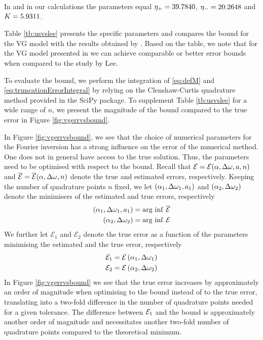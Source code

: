 \documentclass[11pt]{amsart}
\begin{document}
In \cite{lee2004option} and in our calculations the parameters equal
$\eta_+ = 39.7840$, $\eta_- = 20.2648$ and $K=5.9311$.



Table \ref{tb:usvslee} presents the specific parameters and compares
the bound for the VG model with the results obtained by \cite{lee2004option}.
Based on the table, we note that for the VG model
presented in \cite{madan1998variance} we can achieve comparable or better error bounds when compared to the study
by Lee. 

To evaluate the bound, we perform the integration of 
\eqref{eq:defM} and \eqref{eq:truncationErrorIntegral}
by relying on the Clenshaw-Curtis quadrature method
provided in the SciPy package.
To supplement Table \ref{tb:usvslee} for a wide range
of $n$,
we present the magnitude of the bound compared to the true error in Figure
\ref{fig:vgerrvsbound}.

In Figure \ref{fig:vgerrvsbound}, we see that the choice of numerical parameters
for the Fourier inversion has a strong influence on the error of the numerical method.
One does not in general have access to the true solution. 
Thus, the parameters need to be optimised 
with respect to the bound.
Recall that $\mathcal{E} = \mathcal{E}(\alpha,\Delta \omega,a, n)$ and 
$\overline {\mathcal{E}} = \overline {\mathcal{E}}(\alpha,\Delta \omega, n)$ denote the true and estimated
errors, respectively. Keeping the number of quadrature points $n$ fixed,
we let $\left( {\alpha_1,\Delta \omega_1,a_1} \right)$ and $\left( {\alpha_2,\Delta \omega_2} \right)$
denote the minimisers of the estimated and true errors, respectively
\begin{align}
\left( {\alpha_1,\Delta \omega_1,a_1} \right)  &= \mathrm{arg ~ inf}~ \overline {\mathcal{E}} 
\label{eq:pdef1}
\\
\left( {\alpha_2,\Delta \omega_2} \right)  &= \mathrm{arg ~ inf} ~ \mathcal{E} 
\label{eq:pdef2}
\end{align}
We further let $\mathcal{E}_1$ and $\mathcal{E}_2$ 
denote the true error as a function of the parameters
minimising the estimated and the true error, respectively
\begin{align}
\mathcal E_1 &= \mathcal{E} \left( {\alpha_1,\Delta\omega_1} \right) 
\label{eq:pdef3}
\\
\mathcal E_2 &= \mathcal{E} \left( {\alpha_2,\Delta\omega_2} \right)  
\label{eq:pdef4}
\end{align}
In Figure \ref{fig:vgerrvsbound} we see that the true error increases by approximately an 
order of magnitude when optimising to the bound instead of to the true error,
translating into a two-fold difference
in the number of quadrature points needed for a given tolerance. 
The difference between ${\mathcal{E}}_1$ 
and the bound is approximately another order of magnitude and necessitates
another two-fold number of quadrature points compared to the theoretical minimum.
\end{document}
